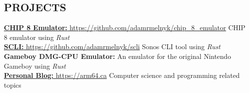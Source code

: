 \documentclass[margin, 10pt]{res} %
\begin{document}
\begin{resume}


\section{PROJECTS}
\href{https://github.com/adamrmelnyk/chip_8_emulator}{{\bf CHIP 8 Emulator:} https://github.com/adamrmelnyk/chip\_8\_emulator} CHIP 8 emulator using {\it Rust} \\
\href{https://github.com/adamrmelnyk/scli}{{\bf SCLI:} https://github.com/adamrmelnyk/scli} Sonos CLI tool using {\it Rust} \\
{\bf Gameboy DMG-CPU Emulator:} An emulator for the original Nintendo Gameboy using {\it Rust}\\
\href{https://arm64.ca}{{\bf Personal Blog:} https://arm64.ca} Computer science and programming related topics \\

\end{resume}
\end{document}
